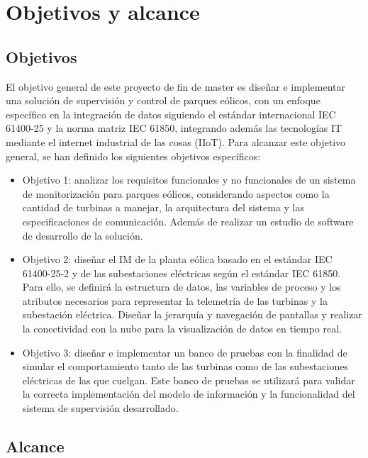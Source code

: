 \chapter{Objetivos y alcance}
\label{cap:objetivos}

\section{Objetivos}

El objetivo general de este proyecto de fin de master es diseñar e implementar una solución de supervisión y control de parques eólicos, con un enfoque específico en la integración de datos siguiendo el estándar internacional IEC 61400-25 y la norma matriz IEC 61850,  integrando además las tecnologías \ac{IT} mediante el internet industrial de las cosas (\ac{IIoT}). Para alcanzar este objetivo general, se han definido los siguientes objetivos específicos:
\begin{itemize}

\item  Objetivo 1: analizar los requisitos funcionales y no funcionales de un sistema de monitorización para parques eólicos, considerando aspectos como la cantidad de turbinas a manejar, la arquitectura del sistema y las especificaciones de comunicación. Además de realizar un estudio de software de desarrollo de la solución.  
\item  Objetivo 2: diseñar el \ac{IM} de la planta eólica basado en el estándar IEC 61400-25-2 y de las subestaciones eléctricas según el estándar IEC 61850. Para ello, se definirá la estructura de datos, las variables de proceso y los atributos necesarios para representar la telemetría de las turbinas y la subestación eléctrica. Diseñar la  jerarquía y navegación de pantallas y realizar la conectividad con la nube para la visualización de datos en tiempo real. 

\item  Objetivo 3: diseñar e implementar un banco de pruebas con la finalidad de simular el comportamiento tanto de las turbinas como de las subestaciones eléctricas de las que cuelgan. Este banco de pruebas se utilizará para validar la correcta implementación del modelo de información y la funcionalidad del sistema de supervisión desarrollado.

\end{itemize}


\section{Alcance}

